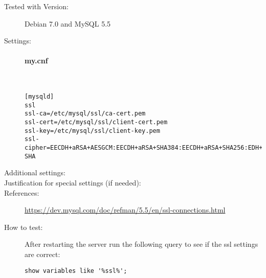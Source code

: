 \begin{description}
\item[Tested with Version:] Debian 7.0 and MySQL 5.5

\item[Settings:] \mbox{}

\paragraph*{my.cnf}\mbox{}\\

\begin{lstlisting}
[mysqld]
ssl
ssl-ca=/etc/mysql/ssl/ca-cert.pem
ssl-cert=/etc/mysql/ssl/client-cert.pem
ssl-key=/etc/mysql/ssl/client-key.pem
ssl-cipher=EECDH+aRSA+AESGCM:EECDH+aRSA+SHA384:EECDH+aRSA+SHA256:EDH+CAMELLIA256:EECDH:EDH+aRSA:+SSLv3:!aNULL:!eNULL:!LOW:!3DES:!MD5:!EXP:!PSK:!SRP:!DSS:!RC4:!SEED:!AES128:!CAMELLIA128:!ECDSA:AES256-SHA
\end{lstlisting}

\item[Additional settings:]


\item[Justification for special settings (if needed):]


\item[References:]
{\small \url{https://dev.mysql.com/doc/refman/5.5/en/ssl-connections.html}}


\item[How to test:]

After restarting the server run the following query to see if the ssl settings are correct:
\begin{lstlisting}
show variables like '%ssl%';
\end{lstlisting}


\end{description}



